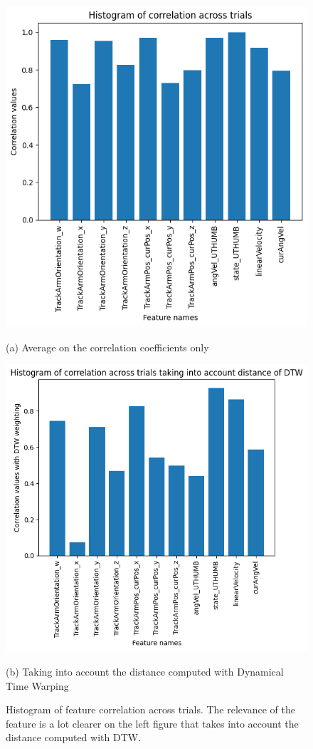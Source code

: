 \documentclass[conference]{IEEEtran}
\begin{document}
\begin{figure}[ht]
  \centering

  \begin{minipage}[b]{0.47\linewidth}
    \centering
    \includegraphics[width=0.9\linewidth]{img/hist_raw.png}
    \caption*{(a) Average on the correlation coefficients only}
  \end{minipage}
  \hfill
  \begin{minipage}[b]{0.47\linewidth}
    \centering
    \includegraphics[width=0.9\linewidth]{img/hist_dtw.png}
    \caption*{(b) Taking into account the  distance computed with Dynamical Time Warping}
  \end{minipage}

\caption{Histogram of feature correlation across trials. The relevance of the feature is a lot clearer on the left figure that takes into account the distance computed with DTW.}
  \label{fig:histcorr}
\end{figure}
\end{document}
